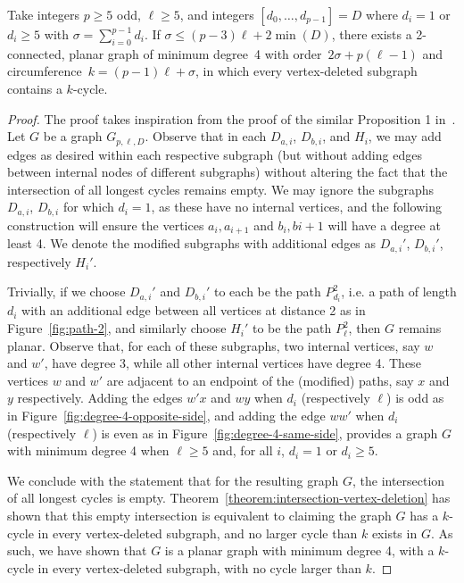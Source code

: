 \begin{theorem}
  \label{theorem:new-vals-rq2}
  Take integers $p\ge5$ odd, $\ell\ge5$, and integers $[d_0,\dots,d_{p-1}]=D$ where $d_i = 1$ or $d_i\ge5$ with $\sigma=\sum_{i=0}^{p-1}d_i$. If $\sigma \le (p-3)\ell + 2\min(D)$, there exists a 2-connected, planar graph of minimum degree~4 with order~$2\sigma + p(\ell-1)$ and circumference~$k=(p-1)\ell + \sigma$, in which every vertex-deleted subgraph contains a $k$-cycle.
\end{theorem}
\begin{proof}
The proof takes inspiration from the proof of the similar Proposition 1 in~\cite{article:zamfirescu}.
Let $G$ be a graph $G_{p,\ell,D}$. Observe that in each $D_{a,i}$, $D_{b,i}$, and $H_i$, we may add edges as desired within each respective subgraph (but without adding edges between internal nodes of different subgraphs) without altering the fact that the intersection of all longest cycles remains empty. We may ignore the subgraphs $D_{a,i}$, $D_{b,i}$ for which $d_i = 1$, as these have no internal vertices, and the following construction will ensure the vertices $a_i, a_{i+1}$ and $b_i, b{i+1}$ will have a degree at least 4. We denote the modified subgraphs with additional edges as $D_{a,i}'$, $D_{b,i}'$, respectively $H_i'$.

Trivially, if we choose $D_{a,i}'$ and $D_{b,i}'$ to each be the path $P_{d_i}^2$, i.e. a path of length $d_i$ with an additional edge between all vertices at distance 2 as in Figure~\ref{fig:path-2}, and similarly choose $H_i'$ to be the path $P_\ell^2$, then $G$ remains planar. Observe that, for each of these subgraphs, two internal vertices, say $w$ and $w'$, have degree 3, while all other internal vertices have degree 4. These vertices $w$ and $w'$ are adjacent to an endpoint of the (modified) paths, say $x$ and $y$ respectively. Adding the edges $w'x$ and $wy$ when $d_i$ (respectively $\ell$) is odd as in Figure~\ref{fig:degree-4-opposite-side}, and adding the edge $ww'$ when $d_i$ (respectively $\ell$) is even as in Figure~\ref{fig:degree-4-same-side}, provides a graph $G$ with minimum degree 4 when $\ell \ge 5$ and, for all $i$, $d_i = 1$ or $d_i \ge 5$.

We conclude with the statement that for the resulting graph $G$, the intersection of all longest cycles is empty. Theorem~\ref{theorem:intersection-vertex-deletion} has shown that this empty intersection is equivalent to claiming the graph $G$ has a $k$-cycle in every vertex-deleted subgraph, and no larger cycle than $k$ exists in $G$. As such, we have shown that $G$ is a planar graph with minimum degree 4, with a $k$-cycle in every vertex-deleted subgraph, with no cycle larger than $k$.


\end{proof}
